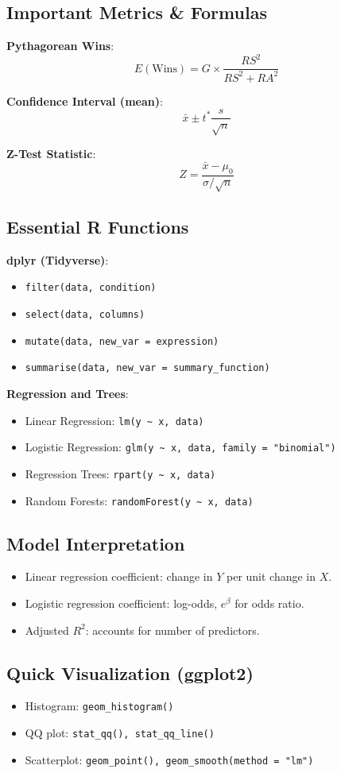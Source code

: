 \documentclass[10pt, landscape]{article}
\begin{document}
\begin{multicols}{3}
\subsection{Important Metrics \& Formulas}

\textbf{Pythagorean Wins}:
\[
E(\text{Wins}) = G \times \frac{RS^2}{RS^2 + RA^2}
\]

\textbf{Confidence Interval (mean)}:
\[
\bar{x} \pm t^*\frac{s}{\sqrt{n}}
\]

\textbf{Z-Test Statistic}:
\[
Z = \frac{\bar{x} - \mu_0}{\sigma/\sqrt{n}}
\]

\subsection{Essential R Functions}

\textbf{dplyr (Tidyverse)}:
\begin{itemize}[noitemsep]
    \item \texttt{filter(data, condition)}
    \item \texttt{select(data, columns)}
    \item \texttt{mutate(data, new\_var = expression)}
    \item \texttt{summarise(data, new\_var = summary\_function)}
\end{itemize}

\textbf{Regression and Trees}:
\begin{itemize}[noitemsep]
    \item Linear Regression: \texttt{lm(y \textasciitilde{} x, data)}
    \item Logistic Regression: \texttt{glm(y \textasciitilde{} x, data, family = "binomial")}
    \item Regression Trees: \texttt{rpart(y \textasciitilde{} x, data)}
    \item Random Forests: \texttt{randomForest(y \textasciitilde{} x, data)}
\end{itemize}

\subsection{Model Interpretation}
\begin{itemize}[noitemsep]
    \item Linear regression coefficient: change in \(Y\) per unit change in \(X\).
    \item Logistic regression coefficient: log-odds, \(e^\beta\) for odds ratio.
    \item Adjusted \(R^2\): accounts for number of predictors.
\end{itemize}

\subsection{Quick Visualization (ggplot2)}
\begin{itemize}[noitemsep]
    \item Histogram: \texttt{geom\_histogram()}
    \item QQ plot: \texttt{stat\_qq(), stat\_qq\_line()}
    \item Scatterplot: \texttt{geom\_point(), geom\_smooth(method = "lm")}
\end{itemize}


\end{multicols}
\end{document}
